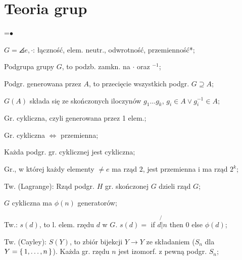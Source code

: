 \section{Teoria grup}
\everypar={$\bullet$ }

$G = \angles{e, \cdot}$: łączność, elem. neutr., odwrotność, przemienność*;

Podgrupa grupy $G$, to podzb. zamkn. na $\cdot$ oraz $^{-1}$;

Podgr. generowana przez $A$, to przecięcie wszystkich podgr. $G \supseteq A$;

$G(A)$ składa się ze skończonych iloczynów $g_1\dots g_k$,
  $g_i\in A \lor g_i^{-1} \in A$;

Gr. cykliczna, czyli generowana przez 1 elem.;

Gr. cykliczna $\Leftrightarrow$ przemienna;

Każda podgr. gr. cyklicznej jest cykliczna;

Gr., w której każdy elementy $\neq e$ ma rząd $2$, jest przemienna i ma rząd $2^k$;

Tw. (Lagrange): Rząd podgr. $H$ gr. skończonej $G$ dzieli rząd $G$;

$G$ cykliczna ma $\phi(n)$ generatorów;

Tw.: $s(d)$, to l. elem. rzędu $d$ w $G$. $s(d) =$ if $d \not{|} n$ then $0$
  else $\phi(d)$;

Tw. (Cayley): $S(Y)$, to zbiór bijekcji $Y \rightarrow Y$ ze składaniem
  ($S_n$ dla $Y=\set{1,\dots,n}$). Każda gr. rzędu $n$ jest izomorf. z pewną
  podgr.  $S_n$;

